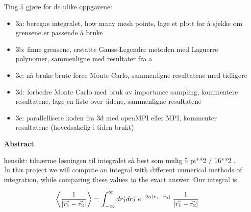 \documentclass{article}
\begin{document}
Ting å gjøre for de ulike oppgavene:
\begin{itemize}

  \item 3a: beregne integralet, how many mesh points, lage et plott for å sjekke om grensene er passende å bruke \\

  \item 3b: finne grensene, erstatte Gauss-Legendre metoden med Laguerre polynomer, sammenligne med resultater fra a \\

  \item 3c: nå bruke brute force Monte Carlo, sammenligne resultatene med tidligere \\

  \item 3d: forbedre Monte Carlo med bruk av importance sampling, kommentere resultatene, lage en liste over tidene, sammenligne resultatene \\

  \item 3e: parallellisere koden fra 3d med openMPI eller MPI, kommenter resultatene (hovedsakelig i tiden brukt)

\end{itemize}


\vspace{1cm}


\begin{center}

{\Large\textbf{Abstract}} \label{sec:Abstract}

\end{center}

\vspace{5mm}



hensikt: tilnærme løsningen til integralet så best som mulig 5 pi**2 / 16**2 . \\

In this project we will compute an integral with different numerical methods of integration, while comparing these values to the exact answer. Our integral is

\begin{equation}
    \left\langle \frac{1}{| \vec{r_1} - \vec{r_2} |} \right\rangle = \int_{-\infty} ^\infty d \vec{r_1} d \vec{r_2} \hspace{1mm} e^{- 2 \alpha (r_1 + r_2)} \hspace{1mm} \frac{1}{| \vec{r_1} - \vec{r_2} |}
\end{equation}
\end{document}
